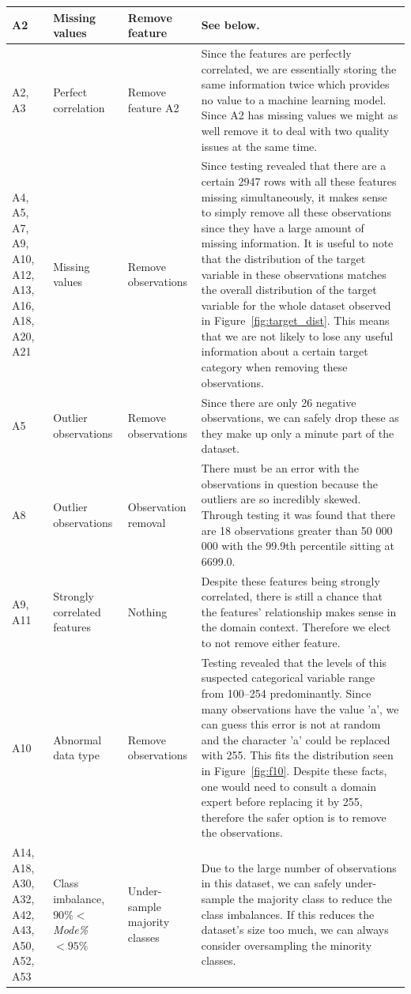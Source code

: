 \documentclass[11pt]{article}
\begin{document}
\begin{longtable}{|p{1.7cm}|p{4cm}|p{3cm}|p{6cm}|}
	\hline
	\endlastfoot
	A2 & Missing values & Remove feature & See below. \\ \hline
	A2, A3 & Perfect correlation & Remove feature A2 & Since the features are perfectly correlated, we are essentially storing the same information twice which provides no value to a machine learning model. Since A2 has missing values we might as well remove it to deal with two quality issues at the same time. \\ \hline
	A4, A5, A7, A9, A10, A12, A13, A16, A18, A20, A21 & Missing values & Remove observations & Since testing revealed that there are a certain 2947 rows with all these features missing simultaneously, it makes sense to simply remove all these observations since they have a large amount of missing information. It is useful to note that the distribution of the target variable in these observations matches the overall distribution of the target variable for the whole dataset observed in Figure~\ref{fig:target_dist}. This means that we are not likely to lose any useful information about a certain target category when removing these observations.  \\ \hline
	A5 & Outlier observations & Remove observations & Since there are only 26 negative observations, we can safely drop these as they make up only a minute part of the dataset. \\
	\hline
	A8 & Outlier observations & Observation removal & There must be an error with the observations in question because the outliers are so incredibly skewed. Through testing it was found that there are 18 observations greater than 50 000 000 with the 99.9th percentile sitting at 6699.0. \\ \hline
	A9, A11 & Strongly correlated features & Nothing & Despite these features being strongly correlated, there is still a chance that the features' relationship makes sense in the domain context. Therefore we elect to not remove either feature.\\ \hline
	A10 & Abnormal data type & Remove observations & Testing revealed that the levels of this suspected categorical variable range from 100–254 predominantly. Since many observations have the value 'a', we can guess this error is not at random and the character 'a' could be replaced with 255. This fits the distribution seen in Figure~\ref{fig:f10}. Despite these facts, one would need to consult a domain expert before replacing it by 255, therefore the safer option is to remove the observations. \\ \hline
	A14, A18, A30, A32, A42, A43, A50, A52, A53 & Class imbalance, $90\%<$\textit{Mode\%} $< 95\%$ & Under-sample majority classes & Due to the large number of observations in this dataset, we can safely under-sample the majority class to reduce the class imbalances. If this reduces the dataset's size too much, we can always consider oversampling the minority classes. \\ \hline

\end{longtable}
\end{document}
